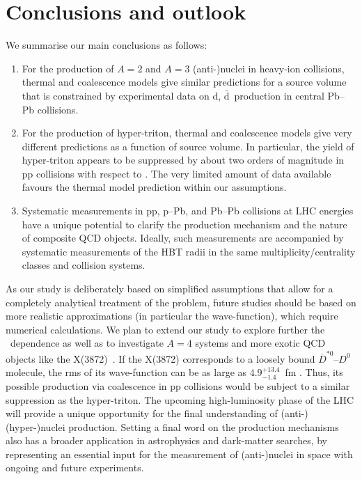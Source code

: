 \section{Conclusions and outlook}
We summarise our main conclusions as follows:
\begin{enumerate}
	\item For the production of $A=2$ and $A=3$ \mbox{(anti-)nuclei} in heavy-ion collisions, thermal and coalescence models give similar predictions for a source volume that is constrained by experimental data on d, $\bar{\mathrm{d}}$~production in central Pb--Pb collisions.
	\item For the production of hyper-triton, thermal and coalescence models give very different predictions as a function of source volume. In particular, the yield of hyper-triton appears to be suppressed by about two orders of magnitude in pp collisions with respect to \hethree. The very limited amount of data available favours the thermal model prediction within our assumptions.
	\item Systematic measurements in pp, p--Pb, and Pb--Pb collisions at LHC energies have a unique potential to clarify the production mechanism and the nature of composite QCD objects. Ideally, such measurements are accompanied by systematic measurements of the HBT radii in the same multiplicity/centrality classes and collision systems.
\end{enumerate}
As our study is deliberately based on simplified assumptions that allow for a completely analytical treatment of the problem, future studies should be based on more realistic approximations (in particular the wave-function), which require numerical calculations. 
We plan to extend our study to explore further the \pt~dependence as well as to investigate $A=4$ systems and more exotic QCD objects like the X(3872)~\cite{Esposito:2015fsa, Cho:2017dcy}. 
If the X(3872) corresponds to a loosely bound $\overline{D}^{*0}$--$D^{0}$ molecule, the rms of its wave-function can be as large as $4.9^{+13.4}_{-1.4}$~fm \cite{Artoisenet:2010uu}. Thus, its possible production via coalescence in pp collisions would be subject to a similar suppression as the hyper-triton. 
The upcoming high-luminosity phase of the LHC
will provide a unique opportunity for the final understanding of \mbox{(anti-)(hyper-)nuclei} production.
Setting a final word on the production mechanisms also has a broader application in astrophysics and dark-matter searches, by representing an essential input for the measurement of (anti-)nuclei in space with ongoing \cite{Alcaraz:2000ss, Poulin:2018wzu} and future \cite{AMS100, Aramaki:2015laa} experiments. 

